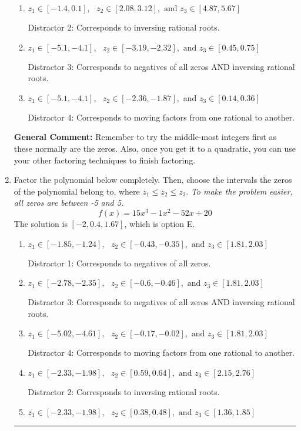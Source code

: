 \documentclass{extbook}[14pt]
\newcommand{\litem}[1]{\item #1

\rule{\textwidth}{0.4pt}}
\begin{document}
\begin{enumerate}
{\begin{enumerate}[label=\Alph*.]
 Distractor 1: Corresponds to negatives of all zeros.
\item \( z_1 \in [-1.4, 0.1], \text{   }  z_2 \in [2.08, 3.12], \text{   and   } z_3 \in [4.87, 5.67] \)

 Distractor 2: Corresponds to inversing rational roots.
\item \( z_1 \in [-5.1, -4.1], \text{   }  z_2 \in [-3.19, -2.32], \text{   and   } z_3 \in [0.45, 0.75] \)

 Distractor 3: Corresponds to negatives of all zeros AND inversing rational roots.
\item \( z_1 \in [-5.1, -4.1], \text{   }  z_2 \in [-2.36, -1.87], \text{   and   } z_3 \in [0.14, 0.36] \)

 Distractor 4: Corresponds to moving factors from one rational to another.
\end{enumerate}

\textbf{General Comment:} Remember to try the middle-most integers first as these normally are the zeros. Also, once you get it to a quadratic, you can use your other factoring techniques to finish factoring.
}
\litem{
Factor the polynomial below completely. Then, choose the intervals the zeros of the polynomial belong to, where $z_1 \leq z_2 \leq z_3$. \textit{To make the problem easier, all zeros are between -5 and 5.}
\[ f(x) = 15x^{3} -1 x^{2} -52 x + 20 \]The solution is \( [-2, 0.4, 1.67] \), which is option E.\begin{enumerate}[label=\Alph*.]
\item \( z_1 \in [-1.85, -1.24], \text{   }  z_2 \in [-0.43, -0.35], \text{   and   } z_3 \in [1.81, 2.03] \)

 Distractor 1: Corresponds to negatives of all zeros.
\item \( z_1 \in [-2.78, -2.35], \text{   }  z_2 \in [-0.6, -0.46], \text{   and   } z_3 \in [1.81, 2.03] \)

 Distractor 3: Corresponds to negatives of all zeros AND inversing rational roots.
\item \( z_1 \in [-5.02, -4.61], \text{   }  z_2 \in [-0.17, -0.02], \text{   and   } z_3 \in [1.81, 2.03] \)

 Distractor 4: Corresponds to moving factors from one rational to another.
\item \( z_1 \in [-2.33, -1.98], \text{   }  z_2 \in [0.59, 0.64], \text{   and   } z_3 \in [2.15, 2.76] \)

 Distractor 2: Corresponds to inversing rational roots.
\item \( z_1 \in [-2.33, -1.98], \text{   }  z_2 \in [0.38, 0.48], \text{   and   } z_3 \in [1.36, 1.85] \)


\end{enumerate}}
\end{enumerate}
\end{document}
